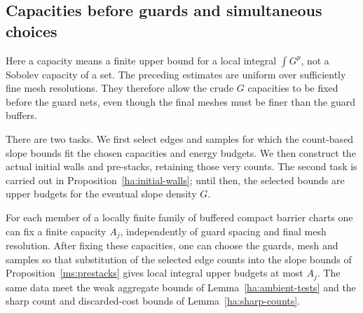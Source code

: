 \subsection{Capacities before guards and simultaneous choices}
\label{ha:guard-schedule}

Here a capacity means a finite upper bound for a local integral
$\int G^p$, not a Sobolev capacity of a set.  The preceding estimates
are uniform over sufficiently fine mesh
resolutions.  They therefore allow the crude $G$ capacities to be
fixed before the guard nets, even though the final meshes must be
finer than the guard buffers.

There are two tasks.  We first select edges and samples for which
the count-based slope bounds fit the chosen capacities and energy
budgets.  We then construct the actual initial walls and pre-stacks,
retaining those very counts.  The second task is carried out in
Proposition~\ref{ha:initial-walls}; until then, the selected bounds
are upper budgets for the eventual slope density $G$.

\begin{lemma}\label{ha:capacities}
For each member of a locally finite family of buffered compact
barrier charts one can fix a finite capacity $A_j$, independently of
guard spacing and final mesh resolution.  After fixing these
capacities, one can choose the guards, mesh and samples so that
substitution of the selected edge counts into the slope bounds of
Proposition~\ref{ms:prestacks} gives local integral upper budgets
at most $A_j$.  The same data meet the weak aggregate bounds of
Lemma~\ref{ha:ambient-tests} and the sharp count and discarded-cost
bounds of Lemma~\ref{ha:sharp-counts}.
\end{lemma}

